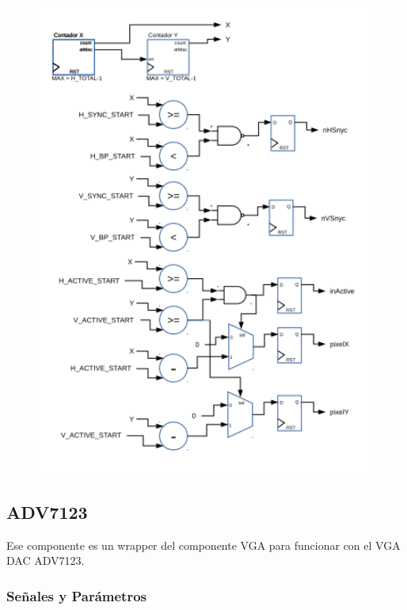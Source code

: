 \documentclass[a4paper]{article}
\begin{document}
\begin{figure}[!h]
\includegraphics[width=13cm]{img/vga.png}
\end{figure}

\subsection{ADV7123}

Ese componente es un wrapper del componente VGA para funcionar con el VGA DAC ADV7123.

\subsubsection{Señales y Parámetros}
\end{document}
